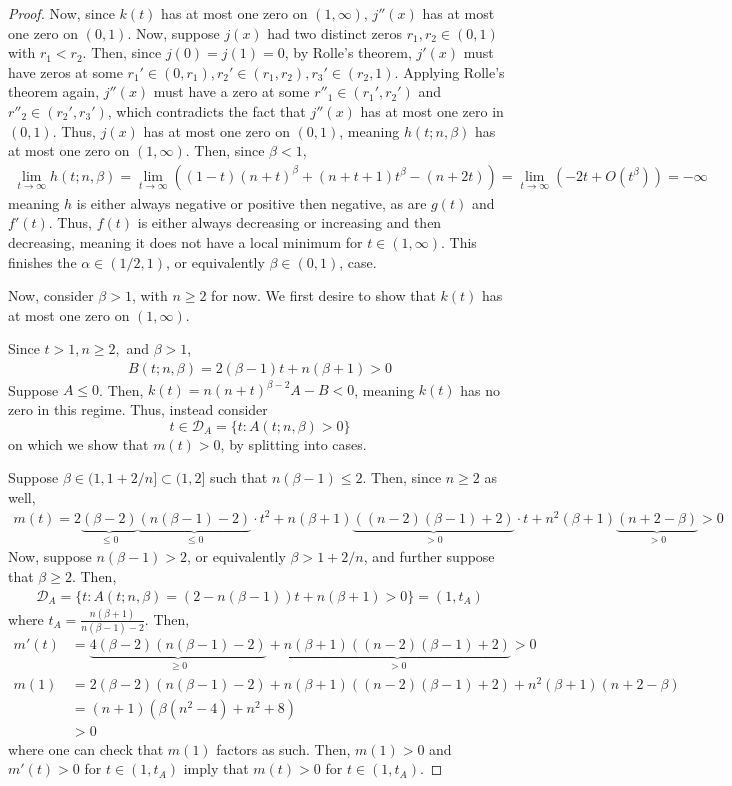 \documentclass[10pt,a4paper]{amsart}
\begin{document}
\begin{proof}
Now, since $k(t)$ has at most one zero on $(1,\infty)$, $j''(x)$ has at most one zero on $(0,1)$. Now, suppose $j(x)$ had two distinct zeros $r_1,r_2\in (0,1)$ with $r_1<r_2$. Then, since $j(0)=j(1)=0$, by Rolle's theorem, $j'(x)$ must have zeros at some $r_1'\in (0,r_1),r_2'\in (r_1,r_2),r_3'\in (r_2,1)$. Applying Rolle's theorem again, $j''(x)$ must have a zero at some $r''_1\in (r_1',r_2')$ and $r''_2\in (r_2',r_3')$, which contradicts the fact that $j''(x)$ has at most one zero in $(0,1)$. Thus, $j(x)$ has at most one zero on $(0,1)$, meaning $h(t;n,\beta)$ has at most one zero on $(1,\infty)$. Then, since $\beta <1$, 
\begin{align*}
    \lim_{t\to \infty}h(t;n,\beta)=\lim_{t\to\infty}((1-t)(n+t)^\beta+(n+t+1)t^\beta -(n+2t))=\lim_{t\to \infty}(-2t+O(t^\beta))=-\infty
\end{align*}
meaning $h$ is either always negative or positive then negative, as are $g(t)$ and $f'(t)$. Thus, $f(t)$ is either always decreasing or increasing and then decreasing, meaning it does not have a local minimum for $t\in (1,\infty)$. This finishes the $\alpha\in (1/2,1)$, or equivalently $\beta \in (0,1)$, case. 

Now, consider $\beta > 1$, with $n\geq 2$ for now. We first desire to show that $k(t)$ has at most one zero on $(1,\infty)$. 


Since $t>1, n\geq 2, $ and $\beta >1$, 
\begin{align*}
   B(t;n,\beta)=2(\beta-1)t+n(\beta+1)>0 
\end{align*}
Suppose $A\leq 0$. Then, $k(t)=n(n+t)^{\beta-2}A-B<0$, meaning $k(t)$ has no zero in this regime. Thus, instead consider
$$t \in \mathcal{D}_A=\{t:A(t;n,\beta)>0\}$$
on which we show that $m(t)>0$, by splitting into cases. 

Suppose $\beta\in (1,1+2/n]\subset (1,2] $ such that $n(\beta-1)\leq 2$. Then, since $n\geq 2$ as well,
\begin{align*}
    m(t)=2\underbrace{(\beta-2)}_{\leq 0}\underbrace{(n(\beta-1)-2)}_{\leq 0}\cdot t^2 +n(\beta+1)\underbrace{((n-2)(\beta-1)+2)}_{>0}\cdot t+n^2(\beta+1)\underbrace{(n+2-\beta)}_{>0}>0
\end{align*}
Now, suppose $n(\beta-1)> 2$, or equivalently $\beta >1+2/n$, and further suppose that $\beta \geq 2$. Then, 
\begin{align*}
    \mathcal{D}_A=\{t:A(t;n,\beta)=(2-n(\beta-1))t+n(\beta+1)>0\}=(1,t_A)
\end{align*}
where $t_A=\frac{n(\beta+1)}{n(\beta-1)-2}$. Then,
\begin{align*}
    m'(t)&=\underbrace{4(\beta-2)(n(\beta-1)-2)}_{\geq 0}+\underbrace{n(\beta+1)((n-2)(\beta-1)+2)}_{>0}>0\\
    m(1)&=2(\beta-2)(n(\beta-1)-2)+n(\beta+1)((n-2)(\beta-1)+2)+n^2(\beta+1)(n+2-\beta)\\
    &=(n+1)(\beta(n^2-4)+n^2+8)\\
    &>0
\end{align*}
where one can check that $m(1)$ factors as such. Then, $m(1)>0$ and $m'(t)>0$ for $t\in(1,t_A)$ imply that $m(t)>0$ for $t\in (1,t_A)$. 


\end{proof}
\end{document}

